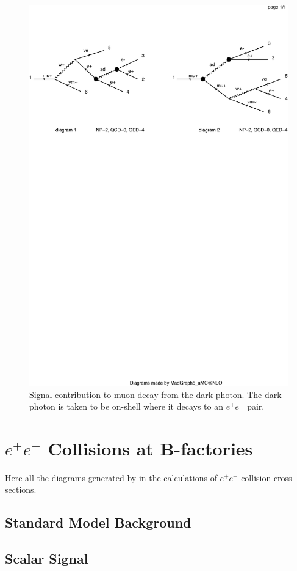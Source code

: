 \begin{figure}[h]
    \centering
    \includegraphics[width=\textwidth,clip=true,viewport=0 500 500 700]{Figures/madgraph_diagrams/mu_eeenunu_darkphoton.pdf}
    \caption{Signal contribution to muon decay from the dark photon. The dark photon is taken to be on-shell where it decays to an $e^+ e^-$ pair.}
    \label{fig:mu_eee_darkphoton}
\end{figure}

\section{$e^+ e^-$ Collisions at B-factories}
\label{app:ee_diagrams}
Here all the diagrams generated by \madgraph in the calculations of $e^+ e^-$ collision cross sections.

\subsection{Standard Model Background}

\subsection{Scalar Signal}
